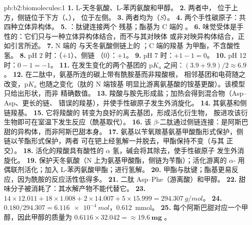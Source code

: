 \begin{solution}{pb:b2:biomolecules:1}
\textbf{1.} L-天冬氨酸、L-苯丙氨酸和甲醇。
\textbf{2.} 两者中， 位于上方，侧链位于下方（、），
 位于左侧。
\textbf{3.} 两者均为（\textit{S}）。
\textbf{4.} 两个手性碳原子：共四种立体异构体。
\textbf{5.} ：肽键连接两个
残基；酯基为 C 端的 。
\textbf{6.} 味觉受体是手性的：它们只与一种立体异构体结合，而不与其对映体
或非对映异构体结合，正如引言所述。
\textbf{7.} N 端的  与天冬氨酸侧链上的 ；C 端的羧基
为甲酯，不含酸性氢。
\textbf{8.} pH 2 时：（$+1$）、侧链 （0）：$+1$。
\textbf{9.} pH 7 时：$+1 - 1 = 0$。
\textbf{10.} pH 12 时：$0 - 1 = -1$。
\textbf{11.} 在发生变化的两个基团的 $\mathrm pK_a$ 之间：$(3.9 + 9.9)/2 \approx 6.9$。
\textbf{12.} 在二肽中，氨基所连的碳上带有酰胺基而非羧酸根，
相邻基团和电荷随之改变，$\mathrm pK_a$ 也随之变化（肽的 N 端铵基
明显比游离氨基酸的铵基更酸）。该模型只给出形状，而非
精确数值。
\textbf{13.} 羧酸与胺先形成盐；加热会得到混合物（Asp--Asp、更长的链、
错误的羧基），并使手性碳原子发生外消旋化。
\textbf{14.} 其氨基和侧链羧基。
\textbf{15.} 它将羧酸的  转变为良好的离去基团，形成活化衍生物，
胺进攻该衍生物即可在室温下发生反应（酰基取代）。
\textbf{16.} 该 $\beta$-二肽通过侧链连接：是阿斯巴甜的异构体，而非阿斯巴甜本身。
\textbf{17.} 氨基以苄氧羰基氨基甲酸酯形式保护，侧链以苄酯形式保护，两者
可在钯上经氢解一并脱去，甲酯保持不变（与其
正交）。
\textbf{18.} 活化的羧酸具有酸性的 $\alpha$ 氢，碱会将其除去，使手性碳原子
发生外消旋化。
\textbf{19.} 保护天冬氨酸（N 上为氨基甲酸酯，侧链为苄酯）；活化游离的
$\alpha$- 用偶联剂活化；加入 L-苯丙氨酸甲酯；进行氢解。
\textbf{20.} 甲酯与肽键；酯基更易反应，因为酰胺的反应活性低得多。
\textbf{21.} 二肽 Asp--Phe（游离酸）和甲醇。
\textbf{22.} 甜味分子被消耗了：其水解产物不能代替它。
\textbf{23.} $14 \times 12.011 + 18 \times 1.008 + 2 \times 14.007 + 5 \times 15.999 =
\qty{294.307}{g/mol}$。
\textbf{24.} $0.180/294.307 = \qty{6.116e-4}{mol}$，\qty{0.612}{mmol}。
\textbf{25.} 每个阿斯巴甜对应一个甲醇，因此甲醇的质量为 $0.6116 \times 32.042 = \boldsymbol{\approx \qty{19.6}{mg}}$
。
\end{solution}
